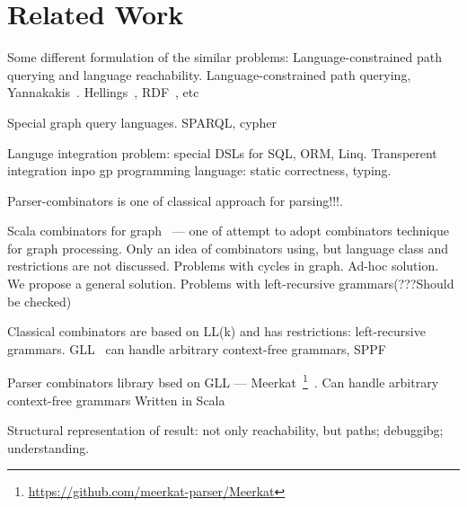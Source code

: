 \section{Related Work}

Some different formulation of the similar problems: Language-constrained path querying and language reachability.
Language-constrained path querying, Yannakakis~\cite{Yannakakis}. 
Hellings~\cite{ConjCFPathQuery, Hellings16}, RDF~\cite{CFGonRDF}, etc~\cite{QueryGraphWithData, RegularDBQuery, GraphQueryWithEarley, FLCpathProblem, graphDB}

Special graph query languages. SPARQL, cypher

Languge integration problem: special DSLs for SQL, ORM, Linq.
Transperent integration inpo gp programming language: static correctness, typing.

Parser-combinators is one of classical approach for parsing!!!.

Scala combinators for graph~\cite{ScalaGraphParsing} --- one of attempt to adopt combinators 
technique for graph processing.
Only an idea of combinators using, but language class and restrictions are not discussed.
Problems with cycles in graph. 
Ad-hoc solution. We propose a general solution.
Problems with left-recursive grammars(???Should be checked)

Classical combinators are based on LL(k) and has restrictions: left-recursive grammars.
GLL~\cite{scott2010gll} can handle arbitrary context-free grammars, SPPF~\cite{SPPF}

Parser combinators library bsed on GLL --- 
Meerkat~\footnote{\url{https://github.com/meerkat-parser/Meerkat}}~\cite{Meerkat}. 
Can handle arbitrary context-free grammars
Written in Scala

Structural representation of result: not only reachability, but paths; debuggibg; understanding.